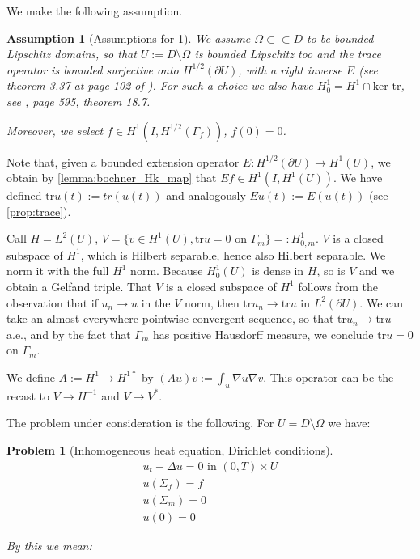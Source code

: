 \documentclass[english,a4paper,9pt,oneside]{scrbook}	%
\theoremstyle{break}
\newtheorem{ass}[equation]{Assumption}
\newtheorem{pb}[equation]{Problem}
\theoremstyle{remark}
\newcommand{\tr}{\text{tr}}
\newcommand{\cc}{\subset\subset}
\begin{document}
\begin{appendices}
We make the following assumption.

\begin{ass}[Assumptions for \cref{pb:diri}]
\label{ass:diri}
We assume $\Omega \cc D $ to be bounded Lipschitz domains, so that $U:=D\setminus \Omega$ is bounded Lipschitz too and  the trace operator is bounded surjective onto $H^{1/2}(\partial U)$, with a right inverse $E$ (see theorem 3.37 at page 102 of \cite{mclean}). For such a choice we also have $H^1_0=H^1\cap \text{ker }\tr$, see \cite{leoni}, page 595, theorem 18.7.

Moreover, we select $f \in H^1(I, H^{1/2}(\Gamma_f))$, $f(0)=0$.
\end{ass}

Note that, given a bounded extension operator $E: H^{1/2}(\partial U) \rightarrow H^1(U)$, we obtain by \cref{lemma:bochner_Hk_map} that $Ef \in H^1(I, H^1(U))$. We have defined $\tr u (t):= tr(u(t))$ and analogously $Eu(t):=E(u(t))$ (see \cref{prop:trace}).

Call $H=L^2(U)$, $V=\{ v \in H^1(U), \tr u = 0 \text{ on } \Gamma_m\}=:H^1_{0,m}$. $V$ is a closed subspace of $H^1$, which is Hilbert separable, hence also Hilbert separable. We norm it with the full $H^1$ norm. Because $H^1_0(U)$ is dense in $H$, so is $V$ and we obtain a Gelfand triple. That $V$ is a closed subspace of $H^1$ follows from the observation that if $u_n\rightarrow u$ in the $V$ norm, then $\tr u_n \rightarrow \tr u$ in $L^2(\partial U)$. We can take an almost everywhere pointwise convergent sequence, so that $\tr u_n \rightarrow \tr u$ a.e., and by the fact that $\Gamma_m$ has positive Hausdorff measure, we conclude $\tr u = 0$ on $\Gamma_m$.

We define $A:= H^1 \rightarrow H^{1*}$ by $(Au)v:=\int_u\nabla u \nabla v$. This operator can be the recast to $V\rightarrow H^{-1}$ and $V\rightarrow V^*$.

The problem under consideration is the following. For $U = D\setminus \Omega$ we have:

\begin{pb}[Inhomogeneous heat equation, Dirichlet conditions]
\label{pb:diri}
\begin{align}
u_t - \Delta u = 0 \text{ in } (0,T)\times U\\
u(\Sigma_f)=f\\
u(\Sigma_m)=0\\
u(0)=0
\end{align}

By this we mean:


\end{pb}
\end{appendices}
\end{document}
